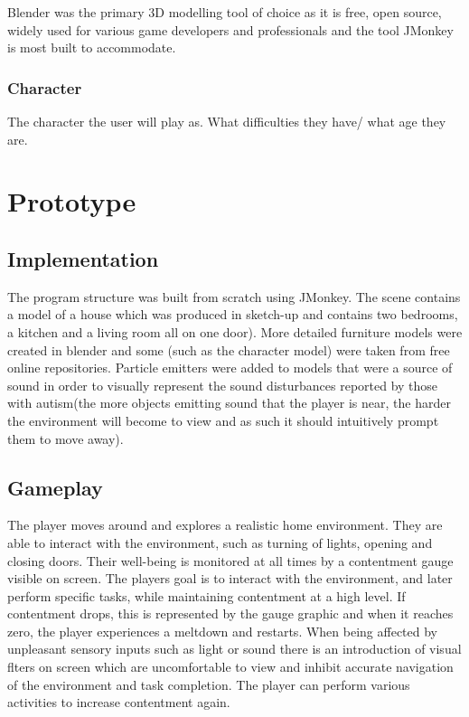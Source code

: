 \documentclass[11pt]{report}
\begin{document}
Blender was the primary 3D modelling tool of choice as it is free, open source, widely used for various game developers and professionals and the tool JMonkey is most built to accommodate.


\subsection{Character}
The character the user will play as. What difficulties they have/ what age they are.


\chapter{Prototype}

\section{Implementation}
The program structure was built from scratch using JMonkey. The scene contains a model of a house which was produced in sketch-up and contains two bedrooms, a kitchen and a living room all on one door). More detailed furniture models were created in blender and some (such as the character model) were taken from free online repositories. Particle emitters were added to models that were a source of sound in order to visually represent the sound disturbances reported by those with autism(the more objects emitting sound that the player is near, the harder the environment will become to view and as such it should intuitively prompt them to move away).

\section{Gameplay}
The player moves around and explores a realistic home environment. They are able to interact with the environment, such as turning of lights, opening and closing doors. Their well-being is monitored at all times by a contentment gauge visible on screen. The players goal is to interact with the environment, and later perform specific tasks, while
maintaining contentment at a high level. If contentment drops, this is represented by the gauge graphic and when it reaches zero, the player experiences a meltdown and restarts. When being affected by unpleasant sensory inputs
such as light or sound there is an introduction of visual flters on screen which are uncomfortable to view and inhibit accurate navigation of the environment and task completion. The player can perform various activities to increase contentment again.
\end{document}

